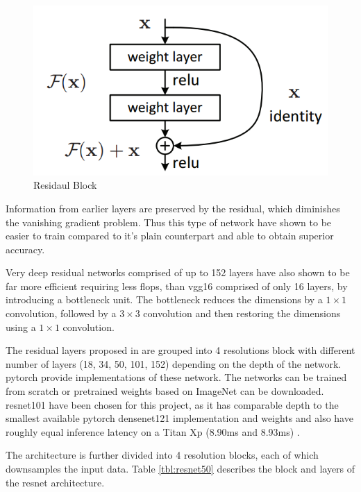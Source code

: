 \begin{figure}
	\centering
	\includegraphics[width=.5\linewidth]{figures/models/residualblock}
	\caption[Residual Block]{Residaul Block}
	\label{fig:residualblock}
\end{figure}

Information from earlier layers are preserved by the residual, which diminishes the vanishing gradient problem. Thus this type of network have shown to be easier to train compared to it’s plain counterpart and able to obtain superior accuracy.  

Very deep residual networks comprised of up to 152 layers have also shown to be far more efficient requiring less \gls{flop}s, than \gls{vgg}16 comprised of only 16 layers, by introducing a bottleneck unit. The bottleneck reduces the dimensions by a $1 \times 1$ convolution, followed by a $3 \times 3$ convolution and then restoring the dimensions using a $1 \times 1$ convolution. 

The residual layers proposed in \cite{he_deep_2015} are grouped into 4 resolutions block with different number of layers (18, 34, 50, 101, 152) depending on the depth of the network. \gls{pytorch} provide implementations of these network. The networks can be trained from scratch or pretrained weights based on ImageNet can be downloaded. \gls{resnet}101 have been chosen for this project, as it has comparable depth to the smallest available \gls{pytorch} \gls{densenet}121 implementation and weights and also have roughly equal inference latency on a Titan Xp (8.90ms and 8.93ms) \cite{bianco_benchmark_2018}.


The architecture is further divided into 4 resolution blocks, each of which downsamples the input data. Table \ref{tbl:resnet50} describes the block and layers of the \gls{resnet} architecture. 


